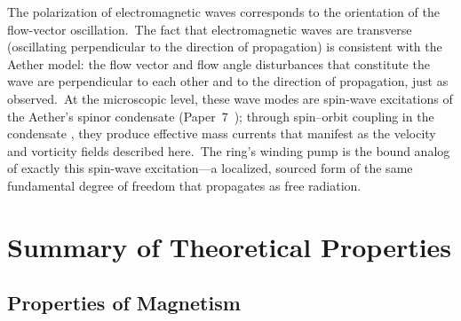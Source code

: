 ﻿\documentclass[12pt,letterpaper]{article}
\begin{document}
The polarization of electromagnetic waves corresponds to the orientation of the
flow-vector oscillation.\ The fact that electromagnetic waves are transverse (oscillating
perpendicular to the direction of propagation) is consistent with the Aether model:
the flow vector and flow angle disturbances that constitute the wave are perpendicular
to each other and to the direction of propagation, just as observed.\ At the microscopic
level, these wave modes are spin-wave excitations of the Aether's spinor condensate
(Paper~7~\cite{otto-quantum}); through spin--orbit coupling in the condensate
\cite{volovik2003}, they produce effective mass currents that manifest as the velocity
and vorticity fields described here.\ The ring's winding pump is the bound analog
of exactly this spin-wave excitation---a localized, sourced form of the same
fundamental degree of freedom that propagates as free radiation.



\section{Summary of Theoretical Properties}

\subsection{Properties of Magnetism}
\end{document}
